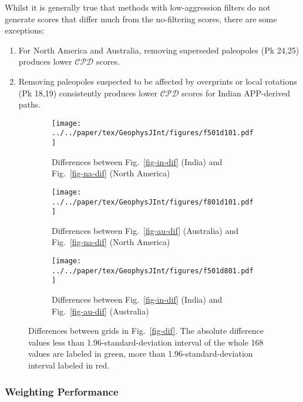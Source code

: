 Whilst it is generally true that methods with low-aggression filters do not
generate scores that differ much from the no-filtering scores, there are some
exceptions:
%
\begin{enumerate}
  \item For North America and Australia, removing superseded paleopoles (Pk
    24,25) produces lower $\mathcal{CPD}$ scores.
  \item Removing paleopoles suspected to be affected by overprints or local
    rotations (Pk 18,19) consistently produces lower $\mathcal{CPD}$ scores for
    Indian APP-derived paths.
\end{enumerate}

\begin{figure*}
  \centering
  \begin{subfigure}{1.01\textwidth}
    \texttt{[image: ../../paper/tex/GeophysJInt/figures/f501d101.pdf]}
    \caption{Differences between Fig.~\ref{fig-in-dif} (India) and
    Fig.~\ref{fig-na-dif} (North America)}\label{fig-i-n-dif}
  \end{subfigure}
  \vspace{.1em}
  \begin{subfigure}{1.01\textwidth}
    \texttt{[image: ../../paper/tex/GeophysJInt/figures/f801d101.pdf]}
    \caption{Differences between Fig.~\ref{fig-au-dif} (Australia) and
    Fig.~\ref{fig-na-dif} (North America)}\label{fig-a-n-dif}
  \end{subfigure}
  \vspace{.1em}
  \begin{subfigure}{1.01\textwidth}
    \texttt{[image: ../../paper/tex/GeophysJInt/figures/f501d801.pdf]}
    \caption{Differences between Fig.~\ref{fig-in-dif} (India) and
    Fig.~\ref{fig-au-dif} (Australia)}\label{fig-i-a-dif}
  \end{subfigure}
  \caption[Differences of $\mathcal{CPD}$ of each plate's paleomagnetic APWPs vs
its FHM predicted APWP]{Differences between grids in Fig.~\ref{fig-dif}. The
absolute difference values less than 1.96-standard-deviation interval of the
whole 168 values are labeled in green, more than 1.96-standard-deviation
interval labeled in red.}\label{fig-d-dif}
\end{figure*}

\subsubsection{Weighting Performance}

